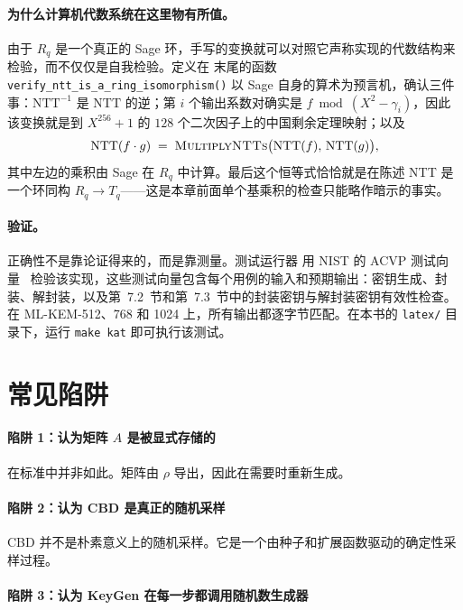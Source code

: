 \paragraph{为什么计算机代数系统在这里物有所值。}
由于 $R_q$ 是一个真正的 Sage 环，手写的变换就可以对照它声称实现的代数结构来检验，而不仅仅是自我检验。定义在  末尾的函数 \texttt{verify\_ntt\_is\_a\_ring\_isomorphism()} 以 Sage 自身的算术为预言机，确认三件事：$\mathrm{NTT}^{-1}$ 是 $\mathrm{NTT}$ 的逆；第 $i$ 个输出系数对确实是 $f \bmod (X^2-\gamma_i)$，因此该变换就是到 $X^{256}+1$ 的 $128$ 个二次因子上的中国剩余定理映射；以及
\[
\mathrm{NTT}(f\cdot g) \;=\; \textsc{MultiplyNTTs}\big(\mathrm{NTT}(f),\,\mathrm{NTT}(g)\big),
\]
其中左边的乘积由 Sage 在 $R_q$ 中计算。最后这个恒等式恰恰就是在陈述 NTT 是一个环同构 $R_q \to T_q$——这是本章前面单个基乘积的检查只能略作暗示的事实。

\paragraph{验证。}
正确性不是靠论证得来的，而是靠测量。测试运行器  用 NIST 的 ACVP 测试向量~\cite{acvp} 检验该实现，这些测试向量包含每个用例的输入和预期输出：密钥生成、封装、解封装，以及第~7.2~节和第~7.3~节中的封装密钥与解封装密钥有效性检查。在 ML-KEM-512、768 和 1024 上，所有输出都逐字节匹配。在本书的 \texttt{latex/} 目录下，运行 \texttt{make kat} 即可执行该测试。

\section{常见陷阱}

\paragraph{陷阱 1：认为矩阵 $A$ 是被显式存储的}

在标准中并非如此。矩阵由 $\rho$ 导出，因此在需要时重新生成。

\paragraph{陷阱 2：认为 CBD 是真正的随机采样}

CBD 并不是朴素意义上的随机采样。它是一个由种子和扩展函数驱动的确定性采样过程。

\paragraph{陷阱 3：认为 KeyGen 在每一步都调用随机数生成器}


